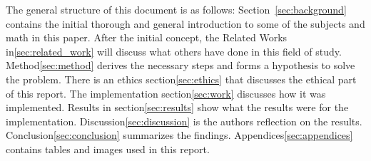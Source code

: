 The general structure of this document is as follows:
Section~\ref{sec:background} contains the initial thorough and general introduction to some of the subjects and math in this paper.
After the initial concept, the Related Works in\ref{sec:related_work} will discuss what others have done in this field of study.
Method\ref{sec:method} derives the necessary steps and forms a hypothesis to solve the problem.
There is an ethics section\ref{sec:ethics} that discusses the ethical part of this report.
The implementation section\ref{sec:work} discusses how it was implemented.
Results in section\ref{sec:results} show what the results were for the implementation.
Discussion\ref{sec:discussion} is the authors reflection on the results.
Conclusion\ref{sec:conclusion} summarizes the findings.
Appendices\ref{sec:appendices} contains tables and images used in this report.











